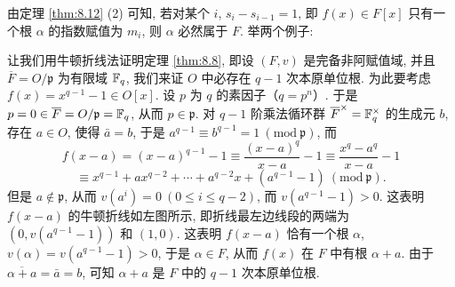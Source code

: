 \begin{remark}
由定理 \ref{thm:8.12} (2) 可知, 若对某个 $i$, $s_i-s_{i-1}=1$, 即 $f(x)\in F[x]$ 只有一个根 $\alpha$ 的指数赋值为 $m_i$, 则 $\alpha$ 必然属于 $F$. 举两个例子:
\end{remark}

\begin{example}
让我们用牛顿折线法证明定理 \ref{thm:8.8}, 即设 $(F,v)$ 是完备非阿赋值域, 并且 $\overline{F}=O/\mathfrak{p}$ 为有限域 $\mathbb{F}_q$, 我们来证 $O$ 中必存在 $q-1$ 次本原单位根. 为此要考虑 $f(x)=x^{q-1}-1\in O[x]$. 设 $p$ 为 $q$ 的素因子（$q=p^n$）. 于是 $p=0\in\overline{F}=O/\mathfrak{p}=\mathbb{F}_q$, 从而 $p\in\mathfrak{p}$. 对 $q-1$ 阶乘法循环群 $\overline{F}^{\times}=\mathbb{F}_q^{\times}$ 的生成元 $b$, 存在 $a\in O$, 使得 $\bar{a}=b$, 于是 $a^{q-1}\equiv b^{q-1}=1\ (\mathrm{mod}\ \mathfrak{p})$, 而
\[
  f(x-a)=(x-a)^{q-1}-1\equiv\frac{(x-a)^q}{x-a}-1\equiv\frac{x^q-a^q}{x-a}-1
\]
\[
  \equiv x^{q-1}+ax^{q-2}+\cdots+a^{q-2}x+(a^{q-1}-1)\ (\mathrm{mod}\ \mathfrak{p}).
\]
但是 $a\notin\mathfrak{p}$, 从而 $v(a^i)=0\ (0\leqslant i\leqslant q-2)$, 而 $v(a^{q-1}-1)>0$. 这表明 $f(x-a)$ 的牛顿折线如左图所示, 即折线最左边线段的两端为 $(0,v(a^{q-1}-1))$ 和 $(1,0)$. 这表明 $f(x-a)$ 恰有一个根 $\alpha$, $v(\alpha)=v(a^{q-1}-1)>0$, 于是 $\alpha\in F$, 从而 $f(x)$ 在 $F$ 中有根 $\alpha+a$. 由于 $\overline{\alpha+a}=\bar{a}=b$, 可知 $\alpha+a$ 是 $F$ 中的 $q-1$ 次本原单位根.

\begin{center}
\end{center}
\end{example}

